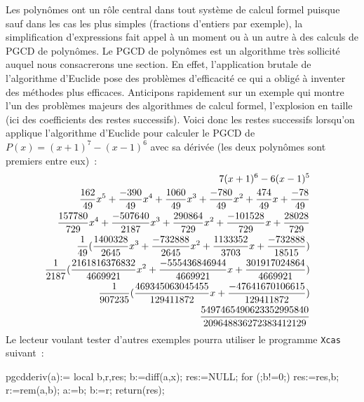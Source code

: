 \documentclass[a4paper,11pt]{article}
\begin{document}
\begin{giacjshere}
Les polynômes ont un r\^ole central dans tout syst\`eme de calcul formel
puisque sauf dans les cas les plus simples (fractions d'entiers par exemple), 
la simplification d'expressions
fait appel \`a un moment ou \`a un autre \`a des calculs
de PGCD de polyn\^omes. Le PGCD de polynômes est un algorithme 
très sollicité auquel nous consacrerons une section. En effet,
l'application brutale de l'algorithme d'Euclide pose des problèmes
d'efficacité ce qui a obligé à inventer des méthodes plus efficaces.
Anticipons rapidement sur un exemple qui montre l'un des problèmes
majeurs des algorithmes de calcul formel, l'explosion en taille
(ici des coefficients des restes successifs).
Voici donc les restes successifs lorsqu'on applique l'algorithme
d'Euclide pour calculer le PGCD de $P(x)=(x+1)^{7}-(x-1)^{6}$ avec
sa d\'eriv\'ee (les deux polyn\^omes sont premiers entre eux)~:
\begin{eqnarray*}
7\* (x+1)^{6}-6\* (x-1)^{5} &&\\
\frac{162}{49} \* x^{5}+\frac{-390}{49} \* x^{4}+\frac{1060}{49} \* x^{3}+\frac{-780}{49} \* x^{2}+\frac{474}{49} \* x+\frac{-78}{49}&&\\
\frac{157780}{729} \* x^{4}+\frac{-507640}{2187} \* x^{3}+\frac{290864}{729} \* x^{2}+\frac{-101528}{729} \* x+\frac{28028}{729}&&\\
\frac{1}{49} \* (\frac{1400328}{2645} \* x^{3}+\frac{-732888}{2645} \* x^{2}+\frac{1133352}{3703} \* x+\frac{-732888}{18515})&&\\
\frac{1}{2187} \* (\frac{2161816376832}{4669921} \* x^{2}+\frac{-555436846944}{4669921} \* x+\frac{301917024864}{4669921})&&\\
\frac{1}{907235} \* (\frac{469345063045455}{129411872} \* x+\frac{-47641670106615}{129411872})&&\\
\frac{5497465490623352995840}{209648836272383412129}
\end{eqnarray*}
Le lecteur voulant tester d'autres exemples pourra utiliser le programme 
\verb|Xcas| suivant~:
\begin{giacprog}
pgcdderiv(a):={
  local b,r,res;
  b:=diff(a,x);
  res:=NULL;
  for (;b!=0;){
    res:=res,b;
    r:=rem(a,b);
    a:=b;
    b:=r;
  }
  return(res);
}
\end{giacprog}


\end{giacjshere}
\end{document}
